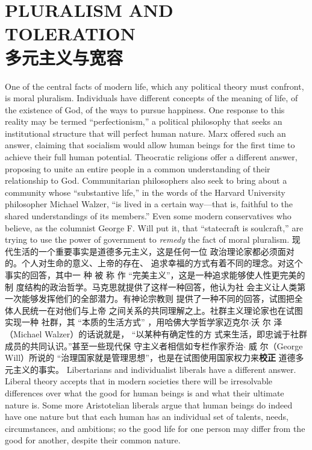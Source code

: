 \chapter{PLURALISM AND TOLERATION\\多元主义与宽容}
\begin{paracol}{2}

One of the central facts of modern life, which any political
theory must confront, is moral pluralism. Individuals
have different concepts of the meaning of life, of the existence of
God, of the ways to pursue happiness. One response to this reality may be termed ``perfectionism,'' a political philosophy that
seeks an institutional structure that will perfect human nature.
Marx offered such an answer, claiming that socialism would
allow human beings for the first time to achieve their full
human potential. Theocratic religions offer a different answer,
proposing to unite an entire people in a common understanding
of their relationship to God. Communitarian philosophers also
seek to bring about a community whose ``substantive life,'' in
the words of the Harvard University philosopher Michael Walzer, ``is lived in a certain way---that is, faithful to the shared
understandings of its members.'' Even some modern conservatives who believe, as the columnist George F. Will put it, that ``statecraft is soulcraft,'' are trying to use the power of government to \textit{remedy} the fact of moral pluralism.
\switchcolumn
现代生活的一个重要事实是道德多元主义，这是任何一位
政治理论家都必须面对的。个人对生命的意义、上帝的存在、
追求幸福的方式有着不同的理念。对这个事实的回答，其中一
种 被 称 作 “完美主义”，这是一种追求能够使人性更完美的制
度结构的政治哲学。马克思就提供了这样一种回答，他认为社
会主义让人类第一次能够发挥他们的全部潜力。有神论宗教则
提供了一种不同的回答，试图把全体人民统一在对他们与上帝
之间关系的共同理解之上。社群主义理论家也在试图实现一种
社群，其 “本质的生活方式” ，用哈佛大学哲学家迈克尔$\cdot$沃
尔 泽（Michael Walzer）的话说就是， “以某种有确定性的方
式来生活，即忠诚于社群成员的共同认识。”甚至一些现代保
守主义者相信如专栏作家乔治$\cdot$ 威 尔（George Will）所说的
“治理国家就是管理思想”，也是在试图使用国家权力来\textbf{校正}
道德多元主义的事实。
\switchcolumn*
Libertarians and individualist liberals have a different answer. Liberal theory accepts that in modern societies there will
be irresolvable differences over what the good for human beings
is and what their ultimate nature is. Some more Aristotelian
liberals argue that human beings do indeed have one nature but
that each human has an individual set of talents, needs, circumstances, and ambitions; so the good life for one person may differ from the good for another, despite their common nature.

\end{paracol}
